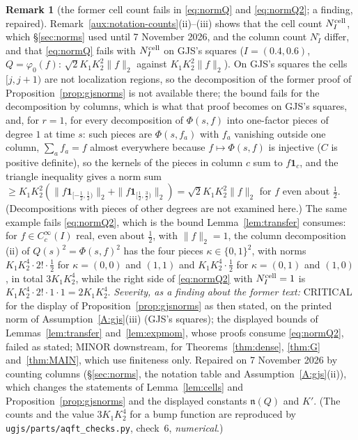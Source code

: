 \documentclass[11pt,a4paper]{article}
\theoremstyle{plain}
\theoremstyle{definition}
\theoremstyle{plain}
\theoremstyle{definition}
\newtheorem{auxrem}[auxlemma]{Remark}
\begin{document}
\begin{auxrem}[the former cell count fails in \eqref{eq:normQ} and \eqref{eq:normQ2}; a finding, repaired]\label{aux:d3-cells}
Remark~\ref{aux:notation-counts}(ii)--(iii) shows that the cell count $N^{\rm cell}_I$, which
\S\ref{sec:norms} used until 7 November 2026, and the column count $N^\square_I$ differ, and that
\eqref{eq:normQ} fails with $N^{\rm cell}_I$ on GJS's squares ($I=(0.4,0.6)$,
$Q=\varphi_0(f)$: $\sqrt2K_1K_2^2\|f\|_2$ against $K_1K_2^2\|f\|_2$).  On GJS's squares the
cells $[j,j+1)$ are not localization regions, so the decomposition of the former proof of
Proposition~\ref{prop:gjsnorms} is not available there; the bound fails for the decomposition
by columns, which is what that proof becomes on GJS's squares, and, for $r=1$, for every
decomposition of $\Phi(s,f)$ into one-factor pieces of degree $1$ at time $s$: such pieces are
$\Phi(s,f_a)$ with $f_a$ vanishing outside one column, $\sum_af_a=f$ almost everywhere because
$f\mapsto\Phi(s,f)$ is injective ($C$ is positive definite), so the kernels of the pieces in
column $c$ sum to $f\mathbf 1_c$, and the triangle inequality gives a norm sum
$\ge K_1K_2^2(\|f\mathbf 1_{[-\frac12,\frac12)}\|_2+\|f\mathbf 1_{[\frac12,\frac32)}\|_2)
=\sqrt2K_1K_2^2\|f\|_2$ for $f$ even about $\frac12$.  (Decompositions with pieces of other
degrees are not examined here.)  The same example fails \eqref{eq:normQ2}, which is the bound
Lemma~\ref{lem:transfer} consumes: for $f\in C_c^\infty(I)$ real, even about $\frac12$, with
$\|f\|_2=1$, the column decomposition (ii) of $Q(s)^2=\Phi(s,f)^2$ has the four pieces
$\kappa\in\{0,1\}^2$, with norms $K_1K_2^4\cdot2!\cdot\frac12$ for $\kappa=(0,0)$ and $(1,1)$
and $K_1K_2^4\cdot\frac12$ for $\kappa=(0,1)$ and $(1,0)$, in total $3K_1K_2^4$, while the right
side of \eqref{eq:normQ2} with $N^{\rm cell}_I=1$ is $K_1K_2^4\cdot2!\cdot1\cdot1=2K_1K_2^4$.
\emph{Severity, as a finding about the former text:} CRITICAL for the display of
Proposition~\ref{prop:gjsnorms} as then stated, on the printed norm of
Assumption~\ref{A:gjs}(iii) (GJS's squares); the displayed bounds of Lemmas~\ref{lem:transfer}
and~\ref{lem:expmom}, whose proofs consume \eqref{eq:normQ2}, failed as stated; MINOR
downstream, for Theorems~\ref{thm:dense}, \ref{thm:G} and~\ref{thm:MAIN}, which use finiteness
only.  Repaired on 7 November 2026 by counting columns (\S\ref{sec:norms}, the notation table and
Assumption~\ref{A:gjs}(ii)), which changes the statements of Lemma~\ref{lem:cells} and
Proposition~\ref{prop:gjsnorms} and the displayed constants $\mathfrak n(Q)$ and $K'$.  (The
counts and the value $3K_1K_2^4$ for a bump function are reproduced by
\texttt{ugjs/parts/aqft\_checks.py}, check~6, \emph{numerical}.)
\end{auxrem}
\end{document}

